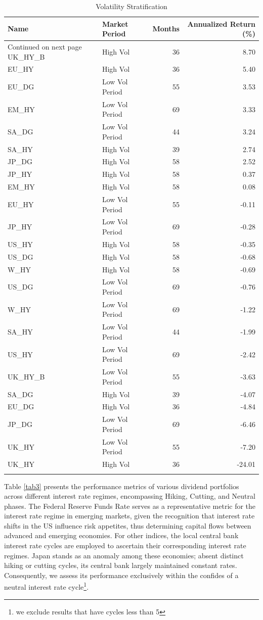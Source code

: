 \documentclass[12pt,preprint, authoryear]{elsarticle}
\numberwithin{equation}{section}
\numberwithin{figure}{section}
\numberwithin{table}{section}
\let\rmarkdownfootnote\footnote%
\def\footnote{\protect\rmarkdownfootnote}
\begin{document}
\begingroup\fontsize{12pt}{13pt}\selectfont
\begin{longtable}{llrr}
  \toprule
Name & Market Period & Months & Annualized Return (\%) \\ 
  \hline 
\endhead 
\hline 
{\footnotesize Continued on next page} 
\endfoot 
\endlastfoot 
 \midrule
UK\_HY\_B & High Vol &  36 & 8.70 \\ 
  EU\_HY & High Vol &  36 & 5.40 \\ 
  EU\_DG & Low Vol Period &  55 & 3.53 \\ 
  EM\_HY & Low Vol Period &  69 & 3.33 \\ 
  SA\_DG & Low Vol Period &  44 & 3.24 \\ 
  SA\_HY & High Vol &  39 & 2.74 \\ 
  JP\_DG & High Vol &  58 & 2.52 \\ 
  JP\_HY & High Vol &  58 & 0.37 \\ 
  EM\_HY & High Vol &  58 & 0.08 \\ 
  EU\_HY & Low Vol Period &  55 & -0.11 \\ 
  JP\_HY & Low Vol Period &  69 & -0.28 \\ 
  US\_HY & High Vol &  58 & -0.35 \\ 
  US\_DG & High Vol &  58 & -0.68 \\ 
  W\_HY & High Vol &  58 & -0.69 \\ 
  US\_DG & Low Vol Period &  69 & -0.76 \\ 
  W\_HY & Low Vol Period &  69 & -1.22 \\ 
  SA\_HY & Low Vol Period &  44 & -1.99 \\ 
  US\_HY & Low Vol Period &  69 & -2.42 \\ 
  UK\_HY\_B & Low Vol Period &  55 & -3.63 \\ 
  SA\_DG & High Vol &  39 & -4.07 \\ 
  EU\_DG & High Vol &  36 & -4.84 \\ 
  JP\_DG & Low Vol Period &  69 & -6.46 \\ 
  UK\_HY & Low Vol Period &  55 & -7.20 \\ 
  UK\_HY & High Vol &  36 & -24.01 \\ 
   \bottomrule
\caption{Volatility Stratification\label{tab2}} 
\end{longtable}
\endgroup

Table \ref{tab3} presents the performance metrics of various dividend
portfolios across different interest rate regimes, encompassing Hiking,
Cutting, and Neutral phases. The Federal Reserve Funds Rate serves as a
representative metric for the interest rate regime in emerging markets,
given the recognition that interest rate shifts in the US influence risk
appetites, thus determining capital flows between advanced and emerging
economies. For other indices, the local central bank interest rate
cycles are employed to ascertain their corresponding interest rate
regimes. Japan stands as an anomaly among these economies; absent
distinct hiking or cutting cycles, its central bank largely maintained
constant rates. Consequently, we assess its performance exclusively
within the confides of a neutral interest rate cycle\footnote{we exclude
  results that have cycles less than 5}.
\end{document}
